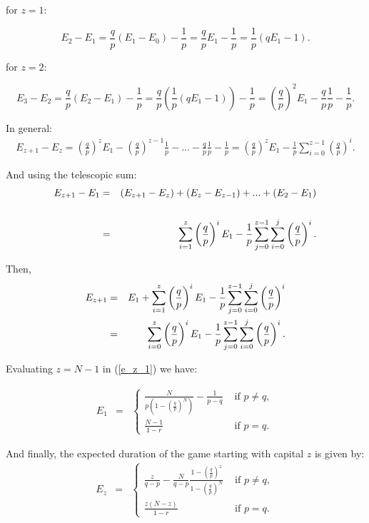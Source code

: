 \documentclass[11pt,twoside]{article}
\numberwithin{Theorem}{section}
\numberwithin{Definition}{section}
\numberwithin{Lemma}{section}
\numberwithin{Algorithm}{section}
\numberwithin{equation}{section}
\begin{document}
for $z = 1$:

$$E_{2}- E_{1} =  \frac{q}{p}(E_{1}- E_{0}) - \frac{1}{p} =  \frac{q}{p}E_{1} - \frac{1}{p} = \frac{1}{p} (qE_{1} -1).$$

for $z = 2$:

$$E_{3}- E_{2} =  \frac{q}{p}(E_{2}- E_{1}) - \frac{1}{p} =  \frac{q}{p}\left(\frac{1}{p} (qE_{1} -1)\right)- \frac{1}{p} = \left(\frac{q}{p}\right)^2E_{1} -\frac{q}{p}\frac{1}{p} - \frac{1}{p}.$$

In general:
\begin{eqnarray}
    E_{z+1}- E_{z} = \left(\frac{q}{p}\right)^zE_{1} - \left(\frac{q}{p}\right)^{z-1}\frac{1}{p}-...-\frac{q}{p}\frac{1}{p} - \frac{1}{p} =\left(\frac{q}{p}\right)^zE_{1} - \frac{1}{p}\sum_{i=0}^{z-1}\left(\frac{q}{p}\right)^{i}.
\end{eqnarray}

And using the telescopic sum: 
\begin{eqnarray}
    E_{z+1}- E_{1} &=& (E_{z+1}- E_{z}) + (E_{z}- E_{z-1})+...+ (E_{2}-E_{1})\notag\\[15pt]
    &=& \sum_{i=1}^{z}\left(\frac{q}{p}\right)^{i}E_{1} - \frac{1}{p}\sum_{j=0}^{z-1}\sum_{i=0}^{j}\left(\frac{q}{p}\right)^{i}.\notag
\end{eqnarray}

Then, 
\begin{eqnarray}\label{e_z_1}
    E_{z+1} &=& E_{1} + \sum_{i=1}^{z}\left(\frac{q}{p}\right)^{i}E_{1} - \frac{1}{p}\sum_{j=0}^{z-1}\sum_{i=0}^{j}\left(\frac{q}{p}\right)^{i}\notag\\
    &=& \sum_{i=0}^{z}\left(\frac{q}{p}\right)^{i}E_{1} - \frac{1}{p}\sum_{j=0}^{z-1}\sum_{i=0}^{j}\left(\frac{q}{p}\right)^{i}.
\end{eqnarray}

Evaluating $z = N-1$ in (\ref{e_z_1}) we have:

\begin{eqnarray}\label{e_1}
E_{1}&=& \left\{
\begin{array}{ll}
\frac{N}{p \left(1 - \left(\frac{q}{p}\right)^{N}\right)} - \frac{1}{p-q}& \text{ if } p\neq q,\\[20pt]
\frac{N-1}{1-r}& \text{ if } p= q. 
\end{array}
\right.
\end{eqnarray}

And finally, the expected duration of the game starting with capital $z$ is given by: 
\begin{eqnarray}\label{e_z}
E_{z}&=& \left\{
\begin{array}{ll}
\frac{z}{q-p} - \frac{N}{q-p}\frac{1 - \left(\frac{q}{p}\right)^{z}}{1 - \left(\frac{q}{p}\right)^{N}}& \text{ if } p\neq q,\\[12pt]
\frac{z(N-z)}{1-r}& \text{ if } p= q. 
\end{array}
\right.
\end{eqnarray}
\end{document}
